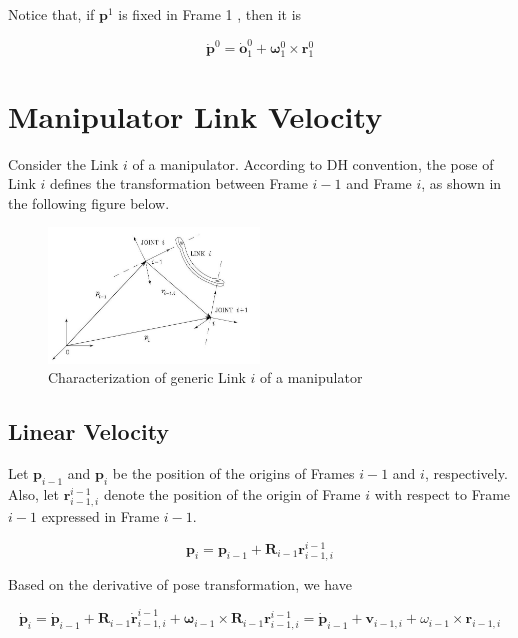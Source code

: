\documentclass[10pt]{article}
\begin{document}
Notice that, if $\boldsymbol{p}^{1}$ is fixed in Frame 1 , then it is

$$
\dot{\boldsymbol{p}}^{0}=\dot{\boldsymbol{o}}_{1}^{0}+\boldsymbol{\omega}_{1}^{0} \times \boldsymbol{r}_{1}^{0}
$$





\section{Manipulator Link Velocity}
Consider the  Link $i$ of a manipulator. According to  DH convention, the pose of  Link $i$ defines the transformation between Frame $i-1$ and Frame $i$, as shown in the following figure below.

\begin{figure}[H]
    \centering
    \includegraphics[max width=0.5\textwidth]{manipulator_linki}
    \caption{Characterization of generic Link $i$ of a manipulator}
    \label{fig:enter-label}
\end{figure}




\subsection{Linear Velocity}


Let $\boldsymbol{p}_{i-1}$ and $\boldsymbol{p}_{i}$ be the position of the origins of Frames $i-1$ and $i$, respectively. Also, let $\boldsymbol{r}_{i-1, i}^{i-1}$ denote the position of the origin of Frame $i$ with respect to Frame $i-1$ expressed in Frame $i-1$. 

$$
\boldsymbol{p}_{i}=\boldsymbol{p}_{i-1}+\boldsymbol{R}_{i-1} \boldsymbol{r}_{i-1, i}^{i-1}
$$

Based on the derivative of pose transformation, we have

$$
    \dot{\boldsymbol{p}}_{i}=\dot{\boldsymbol{p}}_{i-1}+\boldsymbol{R}_{i-1} \dot{\boldsymbol{r}}_{i-1, i}^{i-1}+\boldsymbol{\omega}_{i-1} \times \boldsymbol{R}_{i-1} \boldsymbol{r}_{i-1, i}^{i-1}=\dot{\boldsymbol{p}}_{i-1}+\boldsymbol{v}_{i-1, i}+\omega_{i-1} \times \boldsymbol{r}_{i-1, i}
    $$
\end{document}
